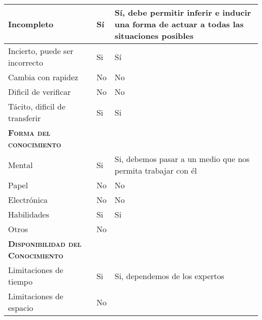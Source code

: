 \begin{table}[H]
{\begin{tabular}{|l|l|l|}
		Incompleto & \multicolumn{1}{p{1.0cm}|}{Sí} & \multicolumn{1}{p{13.0cm}|}{Sí, debe permitir inferir e inducir una forma de actuar a todas las situaciones posibles}\\
		\hline

		Incierto, puede ser incorrecto & \multicolumn{1}{p{1.0cm}|}{Si} & \multicolumn{1}{p{13.0cm}|}{Sí}\\
		\hline

		Cambia con rapidez & \multicolumn{1}{p{1.0cm}|}{No} & \multicolumn{1}{p{13.0cm}|}{No}\\
		\hline

		Dificil de verificar & \multicolumn{1}{p{1.0cm}|}{No} & \multicolumn{1}{p{13.0cm}|}{No}\\
		\hline

		Tácito, dificil de transferir& \multicolumn{1}{p{1.0cm}|}{Si} & \multicolumn{1}{p{13.0cm}|}{Si}\\
		\hline

		\textsc {\textbf{Forma del conocimiento}}& \multicolumn{1}{p{1.0cm}|}{} & \multicolumn{1}{p{13.0cm}|}{}\\
		\hline

		Mental & \multicolumn{1}{p{1.0cm}|}{Si} & \multicolumn{1}{p{13.0cm}|}{Si, debemos pasar a un medio que nos permita trabajar con él}\\
		\hline

		Papel & \multicolumn{1}{p{1.0cm}|}{No} & \multicolumn{1}{p{13.0cm}|}{No}\\
		\hline

		Electrónica & \multicolumn{1}{p{1.0cm}|}{No} & \multicolumn{1}{p{13.0cm}|}{No}\\
		\hline

		Habilidades & \multicolumn{1}{p{1.0cm}|}{Si} & \multicolumn{1}{p{13.0cm}|}{Si}\\
		\hline

		Otros & \multicolumn{1}{p{1.0cm}|}{No} & \multicolumn{1}{p{13.0cm}|}{}\\
		\hline

		\textsc {\textbf{Disponibilidad del Conocimiento}} & \multicolumn{1}{p{1.0cm}|}{} & \multicolumn{1}{p{13.0cm}|}{}\\
		\hline
		Limitaciones de tiempo& \multicolumn{1}{p{1.0cm}|}{Si} & \multicolumn{1}{p{13.0cm}|}{Si, dependemos de los expertos}\\
		\hline

		Limitaciones de espacio& \multicolumn{1}{p{1.0cm}|}{No} & \multicolumn{1}{p{13.0cm}|}{}\\
		\hline


\end{tabular}}
\end{table}
